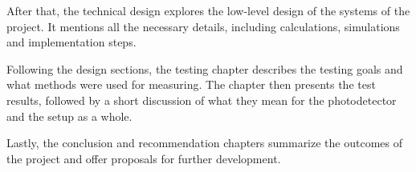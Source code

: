 After that, the technical design explores the low-level design of the systems of the project. It mentions all the necessary details, including calculations, simulations and implementation steps.

Following the design sections, the testing chapter describes the testing goals and what methods were used for measuring. The chapter then presents the test results, followed by a short discussion of what they mean for the photodetector and the setup as a whole. 

Lastly, the conclusion and recommendation chapters summarize the outcomes of the project and offer proposals for further development. 